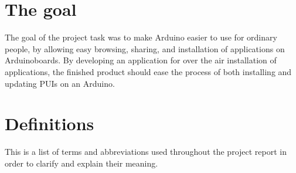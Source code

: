 \section{The goal}
The goal of the project task was to make Arduino easier to use for ordinary people, by allowing easy browsing, sharing, and installation of applications on Arduinoboards. By developing an application for over the air installation of applications, the finished product should ease the process of both installing and updating PUIs on an Arduino.

\section{Definitions}
This is a list of terms and abbreviations used throughout the project report in order to clarify and explain their meaning.

